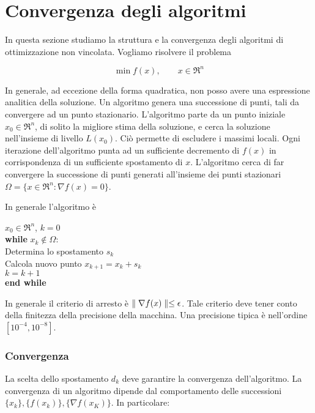 \chapter{Convergenza degli algoritmi}
\label{chp:convergence-algorithms}
In questa sezione studiamo la struttura e la convergenza degli algoritmi di ottimizzazione non vincolata.
Vogliamo risolvere il problema

\begin{equation}
	\min f(x), \qquad x\in\Re^{n}
\end{equation}

In generale, ad eccezione della forma quadratica, non posso avere una espressione analitica della soluzione.
Un algoritmo genera una successione di punti, tali da convergere ad un punto stazionario.
L'algoritmo parte da un punto iniziale $x_{0}\in\Re^{n}$, di solito la migliore stima della soluzione, e cerca la soluzione nell'insieme di livello $L(x_{0})$. Ciò permette di escludere i massimi locali. Ogni iterazione dell'algoritmo punta ad un sufficiente decremento di $f(x)$ in corrispondenza di un sufficiente spostamento di $x$.
L'algoritmo cerca di far convergere la successione di punti generati all'insieme dei punti stazionari $\Omega=\{x\in\Re^{n}:\nabla f(x)=0\}$.

In generale l'algoritmo è

\begin{algorithm}
	\label{alg:iterative-schema}
	$x_{0}\in\Re^{n}$, $k=0$ \\
	\textbf{while} $x_{k}\notin\Omega$: \\
	Determina lo spostamento $s_{k}$ \\
	Calcola nuovo punto $x_{k+1}=x_{k}+s_{k}$ \\
	$k=k+1$\\
	\textbf{end while}
\end{algorithm}

In generale il criterio di arresto è $\parallel \nabla f(x) \parallel\leq\epsilon$. Tale criterio deve tener conto della finitezza della precisione della macchina. Una precisione tipica è nell'ordine $[10^{-4},10^{-8}]$.

\subsection{Convergenza}

La scelta dello spostamento $d_{k}$ deve garantire la convergenza dell'algoritmo.
La convergenza di un algoritmo dipende dal comportamento delle successioni $\{x_{k}\},\{f(x_{k})\},\{\nabla f(x_{K})\}$. In particolare:

